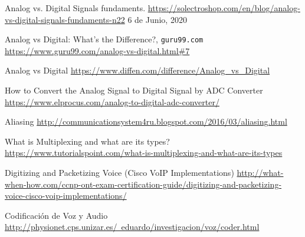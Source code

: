 \begin{thebibliography}{9}
Analog vs. Digital Signals fundaments. \href{https://solectroshop.com/en/blog/analog-vs-digital-signals-fundaments-n22}{https://solectroshop.com/en/blog/analog-vs-digital-signals-fundaments-n22} 6 de Junio, 2020

Analog vs Digital: What's the Difference?, \texttt{guru99.com} \href{https://www.guru99.com/analog-vs-digital.html\#7}{https://www.guru99.com/analog-vs-digital.html\#7}

Analog vs Digital \href{https://www.diffen.com/difference/Analog_vs_Digital}{https://www.diffen.com/difference/Analog_vs_Digital}

How to Convert the Analog Signal to Digital Signal by ADC Converter \href{https://www.elprocus.com/analog-to-digital-adc-converter/}{https://www.elprocus.com/analog-to-digital-adc-converter/}

Aliasing \href{http://communicationsystem4ru.blogspot.com/2016/03/aliasing.html}{http://communicationsystem4ru.blogspot.com/2016/03/aliasing.html}

What is Multiplexing and what are its types? \href{https://www.tutorialspoint.com/what-is-multiplexing-and-what-are-its-types}{https://www.tutorialspoint.com/what-is-multiplexing-and-what-are-its-types}


Digitizing and Packetizing Voice (Cisco VoIP Implementations) \href{http://what-when-how.com/ccnp-ont-exam-certification-guide/digitizing-and-packetizing-voice-cisco-voip-implementations/}{http://what-when-how.com/ccnp-ont-exam-certification-guide/digitizing-and-packetizing-voice-cisco-voip-implementations/}

Codificación de Voz y Audio \href{http://physionet.cps.unizar.es/~eduardo/investigacion/voz/coder.html}{http://physionet.cps.unizar.es/~eduardo/investigacion/voz/coder.html}

\end{thebibliography}
